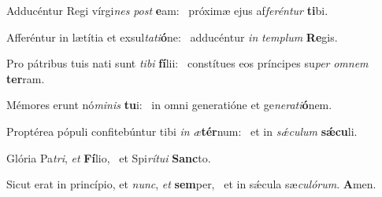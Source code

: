 \item Adducéntur Regi vírgi\textit{nes} \textit{post} \textbf{e}am:~\psstar{} próximæ ejus af\textit{feréntur} \textbf{ti}bi.
\item Afferéntur in lætítia et exsul\textit{tati}\textbf{ó}ne:~\psstar{} adducéntur \textit{in} \textit{templum} \textbf{Re}gis.
\item Pro pátribus tuis nati sunt \textit{tibi} \textbf{fí}lii:~\psstar{} constítues eos príncipes su\textit{per} \textit{omnem} \textbf{ter}ram.
\item Mémores erunt nó\textit{minis} \textbf{tu}i:~\psstar{} in omni generatióne et ge\textit{nerati}\textbf{ó}nem.
\item Proptérea pópuli confitebúntur tibi \textit{in} \textit{æ}\textbf{tér}num:~\psstar{} et in \textit{sǽculum} \textbf{sǽ}\textbf{cu}li.
\item Glória Pa\textit{tri}, \textit{et} \textbf{Fí}lio,~\psstar{} et Spi\textit{rítui} \textbf{Sanc}to.
\item Sicut erat in princípio, et \textit{nunc}, \textit{et} \textbf{sem}per,~\psstar{} et in sǽcula sæ\textit{culórum}. \textbf{A}men.
